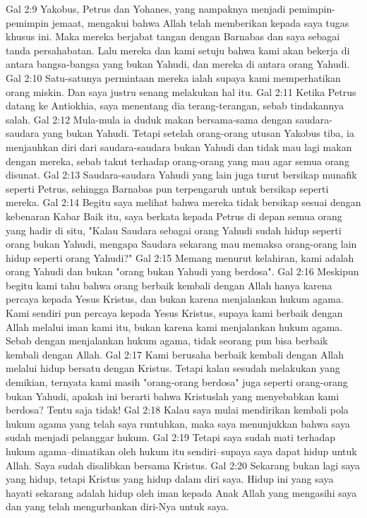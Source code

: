 Gal 2:9  Yakobus, Petrus dan Yohanes, yang nampaknya menjadi pemimpin-pemimpin jemaat, mengakui bahwa Allah telah memberikan kepada saya tugas khusus ini. Maka mereka berjabat tangan dengan Barnabas dan saya sebagai tanda persahabatan. Lalu mereka dan kami setuju bahwa kami akan bekerja di antara bangsa-bangsa yang bukan Yahudi, dan mereka di antara orang Yahudi.
Gal 2:10  Satu-satunya permintaan mereka ialah supaya kami memperhatikan orang miskin. Dan saya justru senang melakukan hal itu.
Gal 2:11  Ketika Petrus datang ke Antiokhia, saya menentang dia terang-terangan, sebab tindakannya salah.
Gal 2:12  Mula-mula ia duduk makan bersama-sama dengan saudara-saudara yang bukan Yahudi. Tetapi setelah orang-orang utusan Yakobus tiba, ia menjauhkan diri dari saudara-saudara bukan Yahudi dan tidak mau lagi makan dengan mereka, sebab takut terhadap orang-orang yang mau agar semua orang disunat.
Gal 2:13  Saudara-saudara Yahudi yang lain juga turut bersikap munafik seperti Petrus, sehingga Barnabas pun terpengaruh untuk bersikap seperti mereka.
Gal 2:14  Begitu saya melihat bahwa mereka tidak bersikap sesuai dengan kebenaran Kabar Baik itu, saya berkata kepada Petrus di depan semua orang yang hadir di situ, "Kalau Saudara sebagai orang Yahudi sudah hidup seperti orang bukan Yahudi, mengapa Saudara sekarang mau memaksa orang-orang lain hidup seperti orang Yahudi?"
Gal 2:15  Memang menurut kelahiran, kami adalah orang Yahudi dan bukan "orang bukan Yahudi yang berdosa".
Gal 2:16  Meskipun begitu kami tahu bahwa orang berbaik kembali dengan Allah hanya karena percaya kepada Yesus Kristus, dan bukan karena menjalankan hukum agama. Kami sendiri pun percaya kepada Yesus Kristus, supaya kami berbaik dengan Allah melalui iman kami itu, bukan karena kami menjalankan hukum agama. Sebab dengan menjalankan hukum agama, tidak seorang pun bisa berbaik kembali dengan Allah.
Gal 2:17  Kami berusaha berbaik kembali dengan Allah melalui hidup bersatu dengan Kristus. Tetapi kalau sesudah melakukan yang demikian, ternyata kami masih "orang-orang berdosa" juga seperti orang-orang bukan Yahudi, apakah ini berarti bahwa Kristuslah yang menyebabkan kami berdosa? Tentu saja tidak!
Gal 2:18  Kalau saya mulai mendirikan kembali pola hukum agama yang telah saya runtuhkan, maka saya menunjukkan bahwa saya sudah menjadi pelanggar hukum.
Gal 2:19  Tetapi saya sudah mati terhadap hukum agama--dimatikan oleh hukum itu sendiri--supaya saya dapat hidup untuk Allah. Saya sudah disalibkan bersama Kristus.
Gal 2:20  Sekarang bukan lagi saya yang hidup, tetapi Kristus yang hidup dalam diri saya. Hidup ini yang saya hayati sekarang adalah hidup oleh iman kepada Anak Allah yang mengasihi saya dan yang telah mengurbankan diri-Nya untuk saya.

